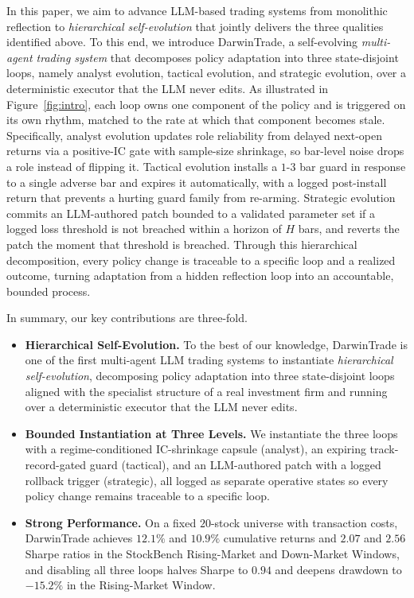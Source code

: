 \documentclass[letterpaper]{article}
\begin{document}
In this paper, we aim to advance LLM-based trading systems from monolithic
reflection to \emph{hierarchical self-evolution} that jointly delivers the
three qualities identified above. To this end, we introduce DarwinTrade, a
self-evolving \emph{multi-agent trading system} that decomposes policy
adaptation into three state-disjoint loops, namely analyst evolution,
tactical evolution, and strategic evolution, over a deterministic executor
that the LLM never edits. As illustrated in Figure~\ref{fig:intro}, each
loop owns one component of the policy and is triggered on its own rhythm,
matched to the rate at which that component becomes stale. Specifically,
analyst evolution updates role reliability from delayed next-open returns
via a positive-IC gate with sample-size shrinkage, so bar-level noise
drops a role instead of flipping it. Tactical evolution installs a $1$-$3$
bar guard in response to a single adverse bar and expires it automatically,
with a logged post-install return that prevents a hurting guard family
from re-arming. Strategic evolution commits an LLM-authored patch bounded
to a validated parameter set if a logged loss threshold is not breached
within a horizon of $H$ bars, and reverts the patch the moment that
threshold is breached. Through this hierarchical
decomposition, every policy change is traceable to a specific loop and a
realized outcome, turning adaptation from a hidden reflection loop into an
accountable, bounded process.

In summary, our key contributions are three-fold.
\begin{itemize}[leftmargin=1em, itemsep=-1ex, topsep=0ex]
    \item \textbf{Hierarchical Self-Evolution.} To the best of our
    knowledge, DarwinTrade is one of the first multi-agent LLM trading
    systems to instantiate \emph{hierarchical self-evolution}, decomposing
    policy adaptation into three state-disjoint loops aligned with the
    specialist structure of a real investment firm and running over a
    deterministic executor that the LLM never edits.
    \item \textbf{Bounded Instantiation at Three Levels.} We instantiate
    the three loops with a regime-conditioned IC-shrinkage capsule
    (analyst), an expiring track-record-gated guard (tactical), and an
    LLM-authored patch with a logged rollback trigger (strategic), all
    logged as separate operative states so every policy change remains
    traceable to a specific loop.
    \item \textbf{Strong Performance.} On a fixed $20$-stock universe
    with transaction costs, DarwinTrade achieves $12.1\%$ and $10.9\%$
    cumulative returns and $2.07$ and $2.56$ Sharpe ratios in the
    StockBench Rising-Market and Down-Market Windows, and disabling all
    three loops halves Sharpe to $0.94$ and deepens drawdown to
    $-15.2\%$ in the Rising-Market Window.
\end{itemize}
\end{document}
